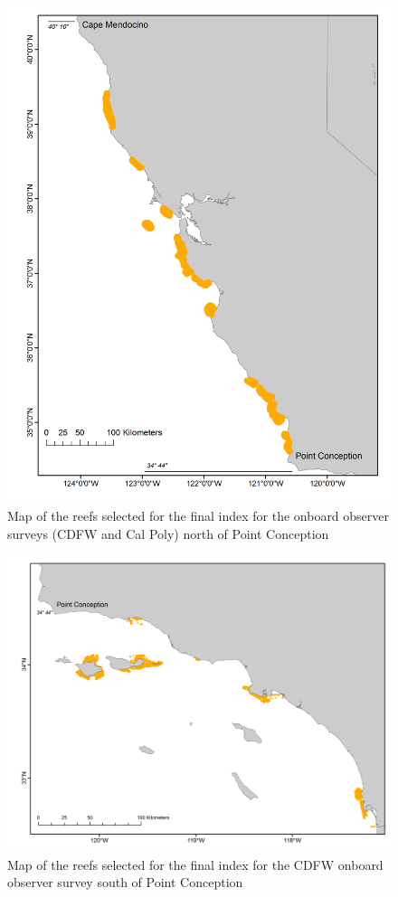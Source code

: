 \documentclass[12pt,]{article}
\begin{document}
\FloatBarrier

\begin{figure}
\centering
\includegraphics{Figures/Onboard_observer_north_sites.png}
\caption{Map of the reefs selected for the final index for the onboard
observer surveys (CDFW and Cal Poly) north of Point Conception
\label{fig:Onboard_observer_north_sites}}
\end{figure}

\FloatBarrier

\begin{figure}
\centering
\includegraphics{Figures/Onboard_observer_south_sites.png}
\caption{Map of the reefs selected for the final index for the CDFW
onboard observer survey south of Point Conception
\label{fig:Onboard_observer_south_sites}}
\end{figure}
\end{document}
